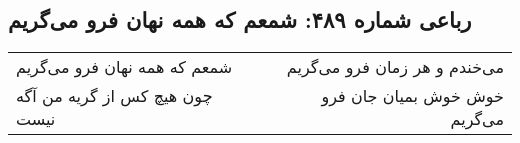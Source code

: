\begin{center}
\section*{رباعی شماره ۴۸۹: شمعم که همه نهان فرو می‌گریم}
\label{sec:sh489}
\begin{longtable}{l p{0.5cm} r}
شمعم که همه نهان فرو می‌گریم
&&
می‌خندم و هر زمان فرو می‌گریم
\\
چون هیچ کس از گریه من آگه نیست
&&
خوش خوش بمیان جان فرو می‌گریم
\\
\end{longtable}
\end{center}
